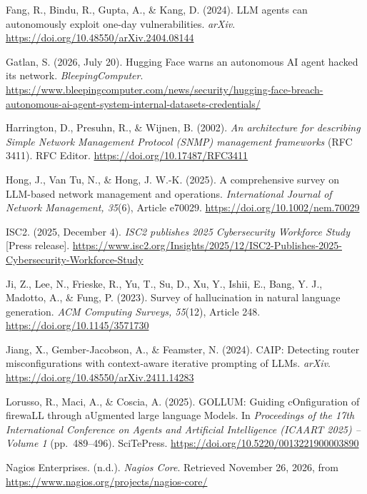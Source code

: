 \begin{list}{}{%
  \setlength{\leftmargin}{2.2em}%
  \setlength{\itemindent}{-2.2em}%
  \setlength{\itemsep}{0.6em}%
  \setlength{\parsep}{0pt}}
\item Fang, R., Bindu, R., Gupta, A., \& Kang, D. (2024). LLM agents can
autonomously exploit one-day vulnerabilities. \textit{arXiv}.
\url{https://doi.org/10.48550/arXiv.2404.08144}

\item Gatlan, S. (2026, July 20). Hugging Face warns an autonomous AI agent
hacked its network. \textit{BleepingComputer}.
\url{https://www.bleepingcomputer.com/news/security/hugging-face-breach-autonomous-ai-agent-system-internal-datasets-credentials/}

\item Harrington, D., Presuhn, R., \& Wijnen, B. (2002). \textit{An
architecture for describing Simple Network Management Protocol (SNMP)
management frameworks} (RFC 3411). RFC Editor.
\url{https://doi.org/10.17487/RFC3411}

\item Hong, J., Van Tu, N., \& Hong, J. W.-K. (2025). A comprehensive survey
on LLM-based network management and operations. \textit{International Journal
of Network Management, 35}(6), Article e70029.
\url{https://doi.org/10.1002/nem.70029}

\item ISC2. (2025, December 4). \textit{ISC2 publishes 2025 Cybersecurity
Workforce Study} [Press release].
\url{https://www.isc2.org/Insights/2025/12/ISC2-Publishes-2025-Cybersecurity-Workforce-Study}

\item Ji, Z., Lee, N., Frieske, R., Yu, T., Su, D., Xu, Y., Ishii, E., Bang,
Y. J., Madotto, A., \& Fung, P. (2023). Survey of hallucination in natural
language generation. \textit{ACM Computing Surveys, 55}(12), Article 248.
\url{https://doi.org/10.1145/3571730}

\item Jiang, X., Gember-Jacobson, A., \& Feamster, N. (2024). CAIP: Detecting
router misconfigurations with context-aware iterative prompting of LLMs.
\textit{arXiv}. \url{https://doi.org/10.48550/arXiv.2411.14283}

\item Lorusso, R., Maci, A., \& Coscia, A. (2025). GOLLUM: Guiding
cOnfiguration of firewaLL through aUgmented large language Models. In
\textit{Proceedings of the 17th International Conference on Agents and
Artificial Intelligence (ICAART 2025) -- Volume 1} (pp.~489--496).
SciTePress. \url{https://doi.org/10.5220/0013221900003890}

\item Nagios Enterprises. (n.d.). \textit{Nagios Core}. Retrieved November 26,
2026, from \url{https://www.nagios.org/projects/nagios-core/}


\end{list}
